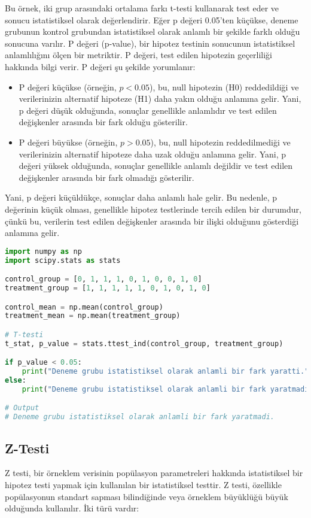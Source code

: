 Bu örnek, iki grup arasındaki ortalama farkı t-testi kullanarak test eder ve sonucu istatistiksel olarak değerlendirir. Eğer p değeri 0.05'ten küçükse, deneme grubunun kontrol grubundan istatistiksel olarak anlamlı bir şekilde farklı olduğu sonucuna varılır. P değeri (p-value), bir hipotez testinin sonucunun istatistiksel anlamlılığını ölçen bir metriktir. P değeri, test edilen hipotezin geçerliliği hakkında bilgi verir. P değeri şu şekilde yorumlanır:
\begin{itemize}
    \item P değeri küçükse (örneğin, $p < 0.05$), bu, null hipotezin (H0) reddedildiği ve verilerinizin alternatif hipoteze (H1) daha yakın olduğu anlamına gelir. Yani, p değeri düşük olduğunda, sonuçlar genellikle anlamlıdır ve test edilen değişkenler arasında bir fark olduğu gösterilir.
    \item P değeri büyükse (örneğin, $p > 0.05$), bu, null hipotezin reddedilmediği ve verilerinizin alternatif hipoteze daha uzak olduğu anlamına gelir. Yani, p değeri yüksek olduğunda, sonuçlar genellikle anlamlı değildir ve test edilen değişkenler arasında bir fark olmadığı gösterilir.
\end{itemize}

Yani, p değeri küçüldükçe, sonuçlar daha anlamlı hale gelir. Bu nedenle, p değerinin küçük olması, genellikle hipotez testlerinde tercih edilen bir durumdur, çünkü bu, verilerin test edilen değişkenler arasında bir ilişki olduğunu gösterdiği anlamına gelir.

\begin{lstlisting}[language=Python]
import numpy as np
import scipy.stats as stats

control_group = [0, 1, 1, 1, 0, 1, 0, 0, 1, 0]
treatment_group = [1, 1, 1, 1, 1, 0, 1, 0, 1, 0]

control_mean = np.mean(control_group)
treatment_mean = np.mean(treatment_group)

# T-testi
t_stat, p_value = stats.ttest_ind(control_group, treatment_group)

if p_value < 0.05:
    print("Deneme grubu istatistiksel olarak anlamli bir fark yaratti.")
else:
    print("Deneme grubu istatistiksel olarak anlamli bir fark yaratmadi.")

# Output
# Deneme grubu istatistiksel olarak anlamli bir fark yaratmadi.
\end{lstlisting}

\subsection{Z-Testi}
Z testi, bir örneklem verisinin popülasyon parametreleri hakkında istatistiksel bir hipotez testi yapmak için kullanılan bir istatistiksel testtir. Z testi, özellikle popülasyonun standart sapması bilindiğinde veya örneklem büyüklüğü büyük olduğunda kullanılır. İki türü vardır:

